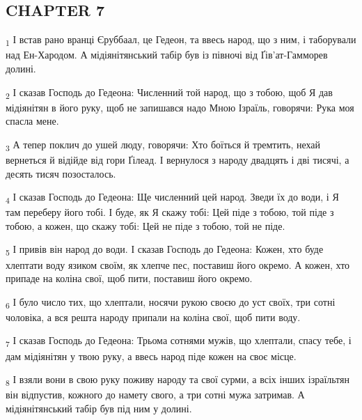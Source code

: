 \subsection{CHAPTER 7}
\begin{tcolorbox}
\textsubscript{1} І встав рано вранці Єруббаал, це Гедеон, та ввесь народ, що з ним, і таборували над Ен-Хародом. А мідіянітянський табір був із півночі від Ґів'ат-Гамморев долині.
\end{tcolorbox}
\begin{tcolorbox}
\textsubscript{2} І сказав Господь до Гедеона: Численний той народ, що з тобою, щоб Я дав мідіянітян в його руку, щоб не запишався надо Мною Ізраїль, говорячи: Рука моя спасла мене.
\end{tcolorbox}
\begin{tcolorbox}
\textsubscript{3} А тепер поклич до ушей люду, говорячи: Хто боїться й тремтить, нехай вернеться й відійде від гори Ґілеад. І вернулося з народу двадцять і дві тисячі, а десять тисяч позосталось.
\end{tcolorbox}
\begin{tcolorbox}
\textsubscript{4} І сказав Господь до Гедеона: Ще численний цей народ. Зведи їх до води, і Я там переберу його тобі. І буде, як Я скажу тобі: Цей піде з тобою, той піде з тобою, а кожен, що скажу тобі: Цей не піде з тобою, той не піде.
\end{tcolorbox}
\begin{tcolorbox}
\textsubscript{5} І привів він народ до води. І сказав Господь до Гедеона: Кожен, хто буде хлептати воду язиком своїм, як хлепче пес, поставиш його окремо. А кожен, хто припаде на коліна свої, щоб пити, поставиш його окремо.
\end{tcolorbox}
\begin{tcolorbox}
\textsubscript{6} І було число тих, що хлептали, носячи рукою своєю до уст своїх, три сотні чоловіка, а вся решта народу припали на коліна свої, щоб пити воду.
\end{tcolorbox}
\begin{tcolorbox}
\textsubscript{7} І сказав Господь до Гедеона: Трьома сотнями мужів, що хлептали, спасу тебе, і дам мідіянітян у твою руку, а ввесь народ піде кожен на своє місце.
\end{tcolorbox}
\begin{tcolorbox}
\textsubscript{8} І взяли вони в свою руку поживу народу та свої сурми, а всіх інших ізраїльтян він відпустив, кожного до намету свого, а три сотні мужа затримав. А мідіянітянський табір був під ним у долині.
\end{tcolorbox}
